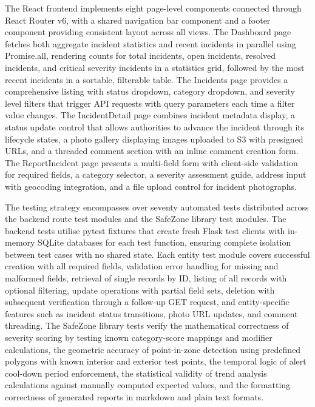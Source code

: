 \documentclass[conference]{IEEEtran}
\begin{document}
The React frontend implements eight page-level components connected through React Router v6, with a shared navigation bar component and a footer component providing consistent layout across all views. The Dashboard page fetches both aggregate incident statistics and recent incidents in parallel using Promise.all, rendering counts for total incidents, open incidents, resolved incidents, and critical severity incidents in a statistics grid, followed by the most recent incidents in a sortable, filterable table. The Incidents page provides a comprehensive listing with status dropdown, category dropdown, and severity level filters that trigger API requests with query parameters each time a filter value changes. The IncidentDetail page combines incident metadata display, a status update control that allows authorities to advance the incident through its lifecycle states, a photo gallery displaying images uploaded to S3 with presigned URLs, and a threaded comment section with an inline comment creation form. The ReportIncident page presents a multi-field form with client-side validation for required fields, a category selector, a severity assessment guide, address input with geocoding integration, and a file upload control for incident photographs.

The testing strategy encompasses over seventy automated tests distributed across the backend route test modules and the SafeZone library test modules. The backend tests utilise pytest fixtures that create fresh Flask test clients with in-memory SQLite databases for each test function, ensuring complete isolation between test cases with no shared state. Each entity test module covers successful creation with all required fields, validation error handling for missing and malformed fields, retrieval of single records by ID, listing of all records with optional filtering, update operations with partial field sets, deletion with subsequent verification through a follow-up GET request, and entity-specific features such as incident status transitions, photo URL updates, and comment threading. The SafeZone library tests verify the mathematical correctness of severity scoring by testing known category-score mappings and modifier calculations, the geometric accuracy of point-in-zone detection using predefined polygons with known interior and exterior test points, the temporal logic of alert cool-down period enforcement, the statistical validity of trend analysis calculations against manually computed expected values, and the formatting correctness of generated reports in markdown and plain text formats.
\end{document}
